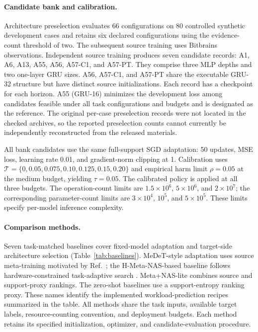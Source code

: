 \documentclass[a4paper,fleqn]{cas-sc}
\begin{document}


\paragraph{Candidate bank and calibration.}
Architecture preselection evaluates 66 configurations on 80 controlled
synthetic development cases and retains six declared configurations using
the evidence-count threshold of two. The subsequent source training uses
Bitbrains observations. Independent source training
produces seven candidate records: A1, A6, A13, A55, A56, A57-C1, and A57-PT.
They comprise three MLP depths and two one-layer GRU sizes. A56, A57-C1,
and A57-PT share the executable GRU-32 structure but have distinct source
initializations. Each record has a checkpoint for each horizon. A55
(GRU-16) minimizes the development loss among candidates feasible under all
task configurations and budgets and is designated as the reference.
The original per-case preselection records were not located in the checked
archives, so the reported preselection counts cannot currently be independently
reconstructed from the released materials.

All bank candidates use the same full-support SGD adaptation: 50 updates,
MSE loss, learning rate 0.01, and gradient-norm clipping at 1. Calibration
uses $\mathcal T=\{0,0.05,0.075,0.10,0.125,0.15,0.20\}$ and empirical
harm limit $\rho=0.05$ at the medium budget, yielding $\tau=0.05$.
The calibrated policy is applied at all three budgets. The operation-count
limits are $1.5\times10^6$, $5\times10^6$, and $2\times10^7$; the
corresponding parameter-count limits are $3\times10^4$, $10^5$, and
$5\times10^5$. These limits specify per-model inference complexity.

\paragraph{Comparison methods.}
Seven task-matched baselines cover fixed-model adaptation and target-side
architecture selection (Table~\ref{tab:baselines}). MeDeT-style adaptation
uses source meta-training motivated by Ref.~\cite{ref11}; the
H-Meta-NAS-based baseline follows hardware-constrained task-adaptive search
\cite{ref30}. Meta+NAS-lite combines source and support-proxy rankings.
The zero-shot baselines use a support-entropy ranking proxy. These names
identify the implemented workload-prediction recipes summarized in the table.
All methods share the task inputs, available target labels, resource-counting
convention, and deployment budgets. Each method retains its specified
initialization, optimizer, and candidate-evaluation procedure.
\end{document}
